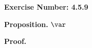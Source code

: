 \documentclass{article}
\begin{document}
\noindent \textbf{Exercise Number: 4.5.9}  %

\medskip 

\noindent \textbf{Proposition.} $\var$

\bigskip

\noindent \textbf{Proof.}
\end{document}
